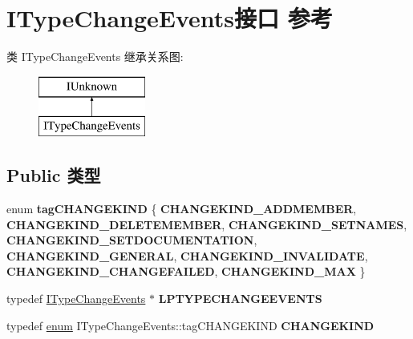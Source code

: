 \hypertarget{interface_i_type_change_events}{}\section{I\+Type\+Change\+Events接口 参考}
\label{interface_i_type_change_events}
类 I\+Type\+Change\+Events 继承关系图\+:\begin{figure}[H]
\begin{center}
\leavevmode
\includegraphics[height=2.000000cm]{interface_i_type_change_events}
\end{center}
\end{figure}
\subsection*{Public 类型}
\begin{DoxyCompactItemize}
\item 
\mbox{\label{interface_i_type_change_events_a49292717c31bb2833ec5b8115ccbe8ec}} 
enum {\bfseries tag\+C\+H\+A\+N\+G\+E\+K\+I\+ND} \{ \newline
{\bfseries C\+H\+A\+N\+G\+E\+K\+I\+N\+D\+\_\+\+A\+D\+D\+M\+E\+M\+B\+ER}, 
{\bfseries C\+H\+A\+N\+G\+E\+K\+I\+N\+D\+\_\+\+D\+E\+L\+E\+T\+E\+M\+E\+M\+B\+ER}, 
{\bfseries C\+H\+A\+N\+G\+E\+K\+I\+N\+D\+\_\+\+S\+E\+T\+N\+A\+M\+ES}, 
{\bfseries C\+H\+A\+N\+G\+E\+K\+I\+N\+D\+\_\+\+S\+E\+T\+D\+O\+C\+U\+M\+E\+N\+T\+A\+T\+I\+ON}, 
\newline
{\bfseries C\+H\+A\+N\+G\+E\+K\+I\+N\+D\+\_\+\+G\+E\+N\+E\+R\+AL}, 
{\bfseries C\+H\+A\+N\+G\+E\+K\+I\+N\+D\+\_\+\+I\+N\+V\+A\+L\+I\+D\+A\+TE}, 
{\bfseries C\+H\+A\+N\+G\+E\+K\+I\+N\+D\+\_\+\+C\+H\+A\+N\+G\+E\+F\+A\+I\+L\+ED}, 
{\bfseries C\+H\+A\+N\+G\+E\+K\+I\+N\+D\+\_\+\+M\+AX}
 \}
\item 
\mbox{\label{interface_i_type_change_events_ad53b50cdee416ba769020af6d23f7743}} 
typedef \hyperlink{interface_i_type_change_events}{I\+Type\+Change\+Events} $\ast$ {\bfseries L\+P\+T\+Y\+P\+E\+C\+H\+A\+N\+G\+E\+E\+V\+E\+N\+TS}
\item 
\mbox{\label{interface_i_type_change_events_ad3bca092b924edaa8401b464544e7eab}} 
typedef \hyperlink{interfaceenum}{enum} I\+Type\+Change\+Events\+::tag\+C\+H\+A\+N\+G\+E\+K\+I\+ND {\bfseries C\+H\+A\+N\+G\+E\+K\+I\+ND}
\end{DoxyCompactItemize}
